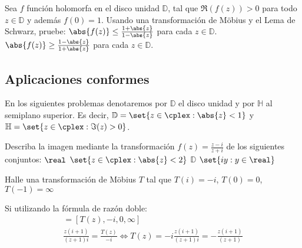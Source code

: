 \begin{problem}
Sea $f$ función holomorfa en el disco unidad $\mathbb{D}$, tal que $\Re(f(z)) > 0$ para todo $z \in \mathbb{D}$ y además $f(0) = 1$. Usando una transformación de Möbius y el Lema de Schwarz, pruebe:
\ppart $\abs{f(z)} \leq \frac{1 + \abs{z}}{1 - \abs{z}}$ para cada $z \in \mathbb{D}$.
\ppart $\abs{f(z)} \geq \frac{1 - \abs{z}}{1 + \abs{z}}$ para cada $z \in \mathbb{D}$.
\solution

\end{problem}



\subsection{Aplicaciones conformes}
En los siguientes problemas denotaremos por $\mathbb{D}$ el disco unidad y por $\mathbb{H}$ al semiplano superior. Es decir, $\mathbb{D} = \set{z \in \cplex: \abs{z} < 1}$ y $\mathbb{H} = \set{z \in \cplex: \Im(z) > 0}$.

\begin{problem}
Describa la imagen mediante la transformación $f(z) = \frac{z - i}{z + i}$ de los siguientes conjuntos:
\ppart $\real$
\ppart $\set{z \in \cplex : \abs{z} < 2}$
\ppart $\mathbb{D}$
\ppart $\set{iy : y \in \real}$
\solution

\end{problem}

\begin{problem}
Halle una transformación de Möbius $T$ tal que $T(i) = -i$, $T(0) = 0$, $T(-1) = \infty$
\solution
{}

Si utilizando la fórmula de razón doble:
\begin{gather*}
[z,i,0,-1] = [T(z),-i,0,\infty]\\
\frac{z(i + 1)}{(z + 1)i} = \frac{T(z)}{-i} \iff T(z) = -i \frac{z(i + 1)}{(z + 1)i} = -\frac{z(i + 1)}{(z + 1)}
\end{gather*}

\end{problem}

